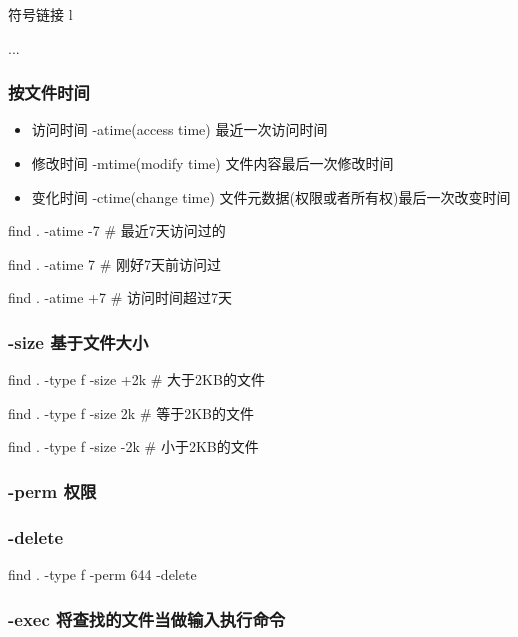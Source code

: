 符号链接	l

...


\subsubsection{按文件时间}


\begin{itemize}
\item 访问时间 -atime(access time) 最近一次访问时间
\item 修改时间 -mtime(modify time) 文件内容最后一次修改时间
\item 变化时间 -ctime(change time) 文件元数据(权限或者所有权)最后一次改变时间
\end{itemize}


\begin{Bash}

find . -atime -7  # 最近7天访问过的

find . -atime 7	  # 刚好7天前访问过

find . -atime +7  # 访问时间超过7天

\end{Bash}


\subsubsection{-size 基于文件大小}


\begin{Bash}

find . -type f -size +2k 		# 大于2KB的文件

find . -type f -size 2k			# 等于2KB的文件

find . -type f -size -2k		# 小于2KB的文件
\end{Bash}


\subsubsection{-perm 权限}

\subsubsection{-delete}

\begin{Bash}[删除匹配的文件]

find . -type f -perm 644 -delete


\end{Bash}

\subsubsection{-exec 将查找的文件当做输入执行命令}


